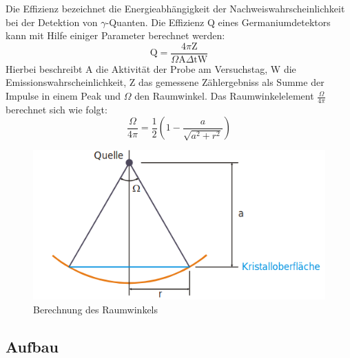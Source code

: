 Die Effizienz bezeichnet die Energieabhängigkeit der Nachweiswahrscheinlichkeit
bei der Detektion von $\gamma$-Quanten.
Die Effizienz Q eines Germaniumdetektors kann mit Hilfe einiger Parameter berechnet werden:
\begin{equation}
    \label{eq:effizienz}
    \text{Q} = \frac{4 \pi \text{Z}}{\Omega \text{A} \Delta \text{t} \text{W}}
\end{equation}
Hierbei beschreibt A die Aktivität der Probe am Versuchstag, W die Emissionswahrscheinlichkeit, Z das gemessene Zählergebniss als Summe der Impulse in einem Peak und $\Omega$ den Raumwinkel.
Das Raumwinkelelement $\frac{\Omega}{4\pi}$ berechnet sich wie folgt:
\begin{equation}
    \label{eq:Omega}
    \frac{\Omega}{4 \pi} = \frac{1}{2} \left(1- \frac{a}{\sqrt{a^2 + r^2}} \right)
\end{equation}

\begin{figure}
  \centering
  \includegraphics[scale=0.7]{Raumwinkel.png}
  \caption{Berechnung des Raumwinkels}
  \label{abb:Raumwinkel}
\end{figure}

\subsection{Aufbau}


